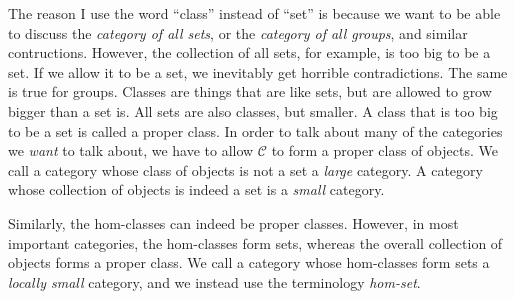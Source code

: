 The reason I use the word ``class'' instead of ``set'' is because we want to be able to discuss the \emph{category of all sets}, or the \emph{category of all groups}, and similar contructions. However, the collection of all sets, for example, is too big to be a set. If we allow it to be a set, we inevitably get horrible contradictions. The same is true for groups. Classes are things that are like sets, but are allowed to grow bigger than a set is. All sets are also classes, but smaller. A class that is too big to be a set is called a proper class. In order to talk about many of the categories we \emph{want} to talk about, we have to allow $\mathcal{C} $ to form a proper class of objects. We call a category whose class of objects is not a set a \emph{large} category. A category whose collection of objects is indeed a set is a \emph{small} category.

Similarly, the hom-classes can indeed be proper classes. However, in most important categories, the hom-classes form sets, whereas the overall collection of objects forms a proper class. We call a category whose hom-classes form sets a \emph{locally small} category, and we instead use the terminology \emph{hom-set}.
